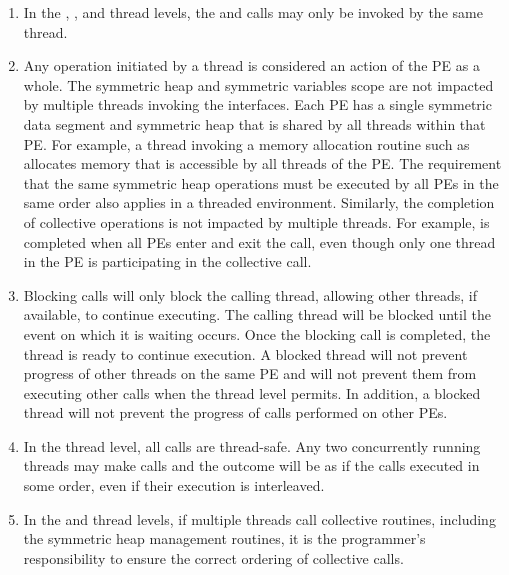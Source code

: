 \begin{enumerate}
\item
In the , , and
 thread levels, the  and
 calls may only be invoked by the same thread.

\item
Any \openshmem operation initiated by a thread is considered an action of the
\ac{PE} as a whole. The symmetric heap and symmetric variables scope are not
impacted by multiple threads invoking the \openshmem interfaces.
Each \ac{PE} has a single symmetric data segment and symmetric heap that is shared by
all threads within that \ac{PE}.  For example, a thread invoking a memory allocation
routine such as  allocates memory that is accessible by
all threads of the \ac{PE}. The requirement that the same symmetric heap operations
must be executed by all \acp{PE} in the same order also applies in a threaded
environment. Similarly, the completion of collective operations is not impacted
by multiple threads. For example,  is completed when
all \acp{PE} enter and exit the  call, even though
only one thread in the \ac{PE} is participating in the collective call.

\item Blocking \openshmem calls will only block the calling thread, allowing
other threads, if available, to continue executing. The calling thread will
be blocked until the event on which it is waiting occurs. Once the blocking call is
completed, the thread is ready to continue execution. A blocked thread
will not prevent progress of other threads on the same \ac{PE} and will not
prevent them from executing other \openshmem calls when the thread level permits.
In addition, a blocked thread will not prevent the progress of \openshmem calls
performed on other \acp{PE}.

\item In the  thread level, all \openshmem calls are thread-safe.
Any two concurrently running threads may make \openshmem calls and the outcome
will be as if the calls executed in some order, even if their execution is interleaved.

\item In the  and  thread levels,
if multiple threads call collective routines, including the symmetric heap
management routines, it is the programmer's responsibility to ensure the
correct ordering of collective calls.

\end{enumerate}
